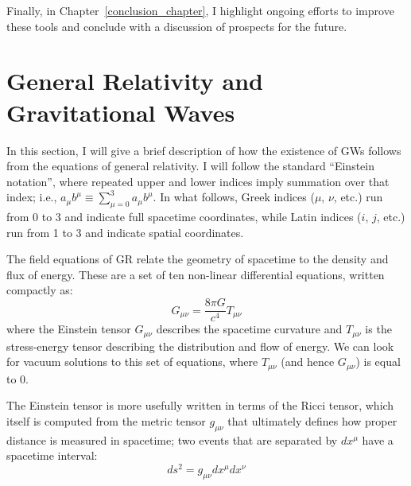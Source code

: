 Finally, in Chapter~\ref{conclusion_chapter}, I highlight ongoing efforts to improve these tools and conclude with a discussion of prospects for the future.

\section{General Relativity and Gravitational Waves}
\label{intro_sec:gr-math}

In this section, I will give a brief description of how the existence of GWs follows from the equations of general relativity.
I will follow the standard ``Einstein notation'', where repeated upper and lower indices imply summation over that index; i.e., $a_\mu b^\mu \equiv \sum_{\mu=0}^3 a_\mu b^\mu$.
In what follows, Greek indices ($\mu$, $\nu$, etc.) run from 0 to 3 and indicate full spacetime coordinates, while Latin indices ($i$, $j$, etc.) run from 1 to 3 and indicate spatial coordinates.

The field equations of GR relate the geometry of spacetime to the density and flux of energy.
These are a set of ten non-linear differential equations, written compactly as:
\begin{equation}
    G_{\mu\nu} = \frac{8\pi G}{c^4} T_{\mu\nu}
\end{equation}
where the Einstein tensor $G_{\mu\nu}$ describes the spacetime curvature and $T_{\mu\nu}$ is the stress-energy tensor describing the distribution and flow of energy.
We can look for vacuum solutions to this set of equations, where $T_{\mu\nu}$ (and hence $G_{\mu\nu}$) is equal to 0.

The Einstein tensor is more usefully written in terms of the Ricci tensor, which itself is computed from the metric tensor $g_{\mu\nu}$ that ultimately defines how proper distance is measured in spacetime; two events that are separated by $dx^\mu$ have a spacetime interval:
\begin{equation}
    \label{eq:ds}
    ds^2 = g_{\mu\nu} dx^\mu dx^\nu
\end{equation}

